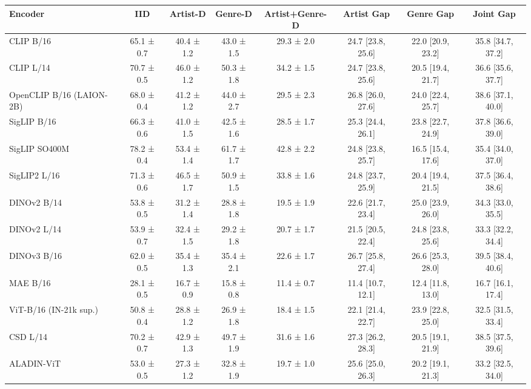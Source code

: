 \begin{tabular}{lccccccc}
\toprule
Encoder & IID & Artist-D & Genre-D & Artist+Genre-D & Artist Gap & Genre Gap & Joint Gap \\
\midrule
CLIP B/16 & 65.1 ± 0.7 & 40.4 ± 1.2 & 43.0 ± 1.5 & 29.3 ± 2.0 & 24.7 [23.8, 25.6] & 22.0 [20.9, 23.2] & 35.8 [34.7, 37.2] \\
CLIP L/14 & 70.7 ± 0.5 & 46.0 ± 1.2 & 50.3 ± 1.8 & 34.2 ± 1.5 & 24.7 [23.8, 25.6] & 20.5 [19.4, 21.7] & 36.6 [35.6, 37.7] \\
OpenCLIP B/16 (LAION-2B) & 68.0 ± 0.4 & 41.2 ± 1.2 & 44.0 ± 2.7 & 29.5 ± 2.3 & 26.8 [26.0, 27.6] & 24.0 [22.4, 25.7] & 38.6 [37.1, 40.0] \\
SigLIP B/16 & 66.3 ± 0.6 & 41.0 ± 1.5 & 42.5 ± 1.6 & 28.5 ± 1.7 & 25.3 [24.4, 26.1] & 23.8 [22.7, 24.9] & 37.8 [36.6, 39.0] \\
SigLIP SO400M & 78.2 ± 0.4 & 53.4 ± 1.4 & 61.7 ± 1.7 & 42.8 ± 2.2 & 24.8 [23.8, 25.7] & 16.5 [15.4, 17.6] & 35.4 [34.0, 37.0] \\
SigLIP2 L/16 & 71.3 ± 0.6 & 46.5 ± 1.7 & 50.9 ± 1.5 & 33.8 ± 1.6 & 24.8 [23.7, 25.9] & 20.4 [19.4, 21.5] & 37.5 [36.4, 38.6] \\
DINOv2 B/14 & 53.8 ± 0.5 & 31.2 ± 1.4 & 28.8 ± 1.8 & 19.5 ± 1.9 & 22.6 [21.7, 23.4] & 25.0 [23.9, 26.0] & 34.3 [33.0, 35.5] \\
DINOv2 L/14 & 53.9 ± 0.7 & 32.4 ± 1.5 & 29.2 ± 1.8 & 20.7 ± 1.7 & 21.5 [20.5, 22.4] & 24.8 [23.8, 25.6] & 33.3 [32.2, 34.4] \\
DINOv3 B/16 & 62.0 ± 0.5 & 35.4 ± 1.3 & 35.4 ± 2.1 & 22.6 ± 1.7 & 26.7 [25.8, 27.4] & 26.6 [25.3, 28.0] & 39.5 [38.4, 40.6] \\
MAE B/16 & 28.1 ± 0.5 & 16.7 ± 0.9 & 15.8 ± 0.8 & 11.4 ± 0.7 & 11.4 [10.7, 12.1] & 12.4 [11.8, 13.0] & 16.7 [16.1, 17.4] \\
ViT-B/16 (IN-21k sup.) & 50.8 ± 0.4 & 28.8 ± 1.2 & 26.9 ± 1.8 & 18.4 ± 1.5 & 22.1 [21.4, 22.7] & 23.9 [22.8, 25.0] & 32.5 [31.5, 33.4] \\
CSD L/14 & 70.2 ± 0.7 & 42.9 ± 1.3 & 49.7 ± 1.9 & 31.6 ± 1.6 & 27.3 [26.2, 28.3] & 20.5 [19.1, 21.9] & 38.5 [37.5, 39.6] \\
ALADIN-ViT & 53.0 ± 0.5 & 27.3 ± 1.2 & 32.8 ± 1.9 & 19.7 ± 1.0 & 25.6 [25.0, 26.3] & 20.2 [19.1, 21.3] & 33.2 [32.5, 34.0] \\
\bottomrule
\end{tabular}
